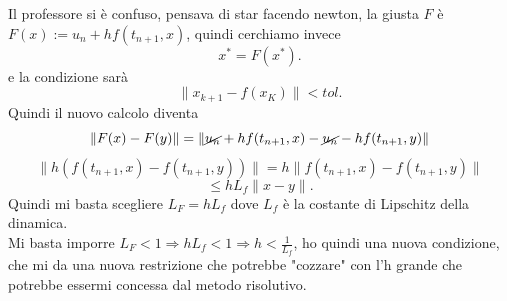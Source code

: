 \documentclass[12px]{article}
\begin{document}
	 Il professore si è confuso, pensava di star facendo newton, la giusta $F$ è  \\
	 $F(x) :=  u_n + hf(t_{n+1},x)$, quindi cerchiamo invece
	 \[
	 x^* = F(x^*)
	 .\] 
	 e la condizione sarà
	 \[
	 \|x_{k+1} - f(x_K)\| < tol
	 .\] 
	 Quindi il nuovo calcolo diventa
	 \[
		 \|F(x) - F(y)\| = \|\cancel{u_n} + hf(t_{n+1},x) - \cancel{u_n} - hf(t_{n+1},y)\|
	 \] 
	 \[
		 \| h(f(t_{n+1},x) - f(t_{n+1},y))\|=  h\|f(t_{n+1},x) - f(t_{n+1}, y)\|
	 \] 
	 \[
	 \leq hL_f\|x-y\|
	 .\] 
	 Quindi mi basta scegliere $L_F = hL_f$ dove  $L_f$ è la costante di Lipschitz della dinamica.\\
	 Mi basta imporre  $L_F < 1 \Rightarrow  hL_f < 1 \Rightarrow  h < \frac { 1}{L_f}$, ho quindi una nuova condizione, che mi da una nuova restrizione che potrebbe "cozzare" con l'h grande che potrebbe essermi concessa dal metodo risolutivo.\\
\end{document}
